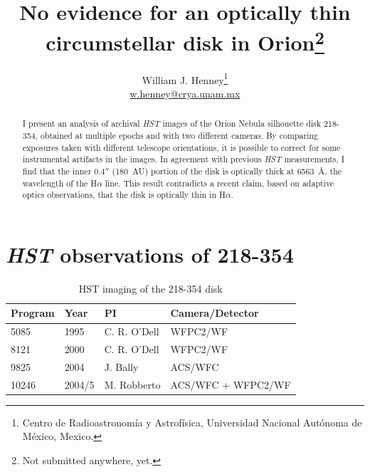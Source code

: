 \documentclass[oneside, 11pt]{article}
\title{No evidence for an optically thin circumstellar disk in Orion\thanks{Not submitted anywhere, yet.}}
\author{William J. Henney\thanks{
    Centro de Radioastronomía y Astrofísica, 
    Universidad Nacional Autónoma de México, Mexico.  
  }\\
  \protect\footnotesize\url{w.henney@crya.unam.mx}
  }
\begin{document}
\maketitle

\begin{abstract}
  I present an analysis of archival \textit{HST} images of  the Orion Nebula silhouette disk 218-354, obtained at multiple epochs and with two different cameras.   By comparing exposures taken with different telescope orientations, it is possible to correct for some instrumental artifacts in the images.   In agreement with previous \textit{HST} measurements, I find that the inner \(0.4''\) (180~AU) portion of the disk is optically thick at 6563~\AA{}, the wavelength of  the H\(\alpha\) line.   This result contradicts a recent claim, based on adaptive optics observations, that the disk is optically thin in H\(\alpha\).

\end{abstract}

\clearpage
\section{\textit{HST} observations of 218-354}
\label{sec:hst}


\begin{table}
  \caption{HST imaging of the 218-354 disk}
  \label{tab:hst}
  \centering
  \smallskip
  \begin{tabular}{llll}\toprule
  Program & Year & PI & Camera/Detector \\ \midrule
  5085 & 1995 & C. R. O'Dell & WFPC2/WF \\
  8121 & 2000 & C. R. O'Dell & WFPC2/WF \\
  9825 & 2004 & J. Bally & ACS/WFC \\
  10246 & 2004/5 & M. Robberto & ACS/WFC + WFPC2/WF\\ \bottomrule
\end{tabular}
\end{table}
\end{document}
